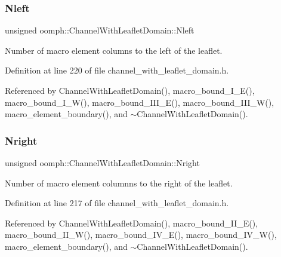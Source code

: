 \subsubsection{\texorpdfstring{Nleft}{Nleft}}
{\footnotesize\ttfamily unsigned oomph\+::\+Channel\+With\+Leaflet\+Domain\+::\+Nleft\hspace{0.3cm}{\ttfamily [protected]}}



Number of macro element columns to the left of the leaflet. 



Definition at line 220 of file channel\+\_\+with\+\_\+leaflet\+\_\+domain.\+h.



Referenced by Channel\+With\+Leaflet\+Domain(), macro\+\_\+bound\+\_\+\+I\+\_\+\+E(), macro\+\_\+bound\+\_\+\+I\+\_\+\+W(), macro\+\_\+bound\+\_\+\+I\+I\+I\+\_\+\+E(), macro\+\_\+bound\+\_\+\+I\+I\+I\+\_\+\+W(), macro\+\_\+element\+\_\+boundary(), and $\sim$\+Channel\+With\+Leaflet\+Domain().

\mbox{\label{classoomph_1_1ChannelWithLeafletDomain_a11aac62965f9bcb7d4c0043669b28f15}} 
\subsubsection{\texorpdfstring{Nright}{Nright}}
{\footnotesize\ttfamily unsigned oomph\+::\+Channel\+With\+Leaflet\+Domain\+::\+Nright\hspace{0.3cm}{\ttfamily [protected]}}



Number of macro element columnns to the right of the leaflet. 



Definition at line 217 of file channel\+\_\+with\+\_\+leaflet\+\_\+domain.\+h.



Referenced by Channel\+With\+Leaflet\+Domain(), macro\+\_\+bound\+\_\+\+I\+I\+\_\+\+E(), macro\+\_\+bound\+\_\+\+I\+I\+\_\+\+W(), macro\+\_\+bound\+\_\+\+I\+V\+\_\+\+E(), macro\+\_\+bound\+\_\+\+I\+V\+\_\+\+W(), macro\+\_\+element\+\_\+boundary(), and $\sim$\+Channel\+With\+Leaflet\+Domain().

\mbox{\label{classoomph_1_1ChannelWithLeafletDomain_a3c6393ef6e626d7a2f2a8ea70c8addbe}} 
